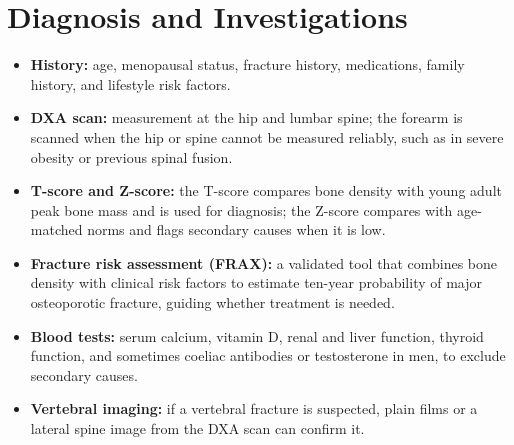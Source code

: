 \section*{Diagnosis and Investigations}
\begin{itemize}
    \item \textbf{History:} age, menopausal status, fracture history, medications, family history, and lifestyle risk factors.
    \item \textbf{DXA scan:} measurement at the hip and lumbar spine; the forearm is scanned when the hip or spine cannot be measured reliably, such as in severe obesity or previous spinal fusion.
    \item \textbf{T-score and Z-score:} the T-score compares bone density with young adult peak bone mass and is used for diagnosis; the Z-score compares with age-matched norms and flags secondary causes when it is low.
    \item \textbf{Fracture risk assessment (FRAX):} a validated tool that combines bone density with clinical risk factors to estimate ten-year probability of major osteoporotic fracture, guiding whether treatment is needed.
    \item \textbf{Blood tests:} serum calcium, vitamin D, renal and liver function, thyroid function, and sometimes coeliac antibodies or testosterone in men, to exclude secondary causes.
    \item \textbf{Vertebral imaging:} if a vertebral fracture is suspected, plain films or a lateral spine image from the DXA scan can confirm it.
\end{itemize}

